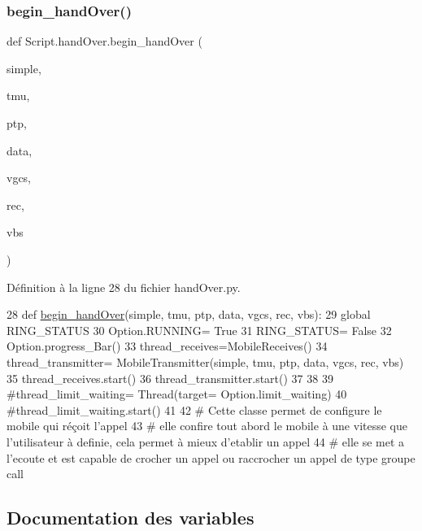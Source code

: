 \subsubsection{\texorpdfstring{begin\+\_\+hand\+Over()}{begin\_handOver()}}
{\footnotesize\ttfamily def Script.\+hand\+Over.\+begin\+\_\+hand\+Over (\begin{DoxyParamCaption}\item[{}]{simple,  }\item[{}]{tmu,  }\item[{}]{ptp,  }\item[{}]{data,  }\item[{}]{vgcs,  }\item[{}]{rec,  }\item[{}]{vbs }\end{DoxyParamCaption})}



Définition à la ligne 28 du fichier hand\+Over.\+py.


\begin{DoxyCode}
28 \textcolor{keyword}{def }\hyperlink{namespaceScript_1_1handOver_a4d9a0e646528d168d925b4bcd6f078a6}{begin\_handOver}(simple, tmu, ptp, data, vgcs, rec, vbs):
29     \textcolor{keyword}{global} RING\_STATUS
30     Option.RUNNING= \textcolor{keyword}{True}
31     RING\_STATUS= \textcolor{keyword}{False}
32     Option.progress\_Bar()
33     thread\_receives=MobileReceives()
34     thread\_transmitter= MobileTransmitter(simple, tmu, ptp, data, vgcs, rec, vbs)
35     thread\_receives.start()
36     thread\_transmitter.start()
37 
38 
39     \textcolor{comment}{#thread\_limit\_waiting= Thread(target= Option.limit\_waiting)
}
40     \textcolor{comment}{#thread\_limit\_waiting.start()
}
41 
42 \textcolor{comment}{# Cette classe permet de configure le mobile qui réçoit l'appel
}
43 \textcolor{comment}{# elle confire tout abord le mobile à une vitesse que l'utilisateur à definie, cela permet à mieux
       d'etablir un appel
}
44 \textcolor{comment}{# elle se met a l'ecoute et est capable de crocher un appel ou raccrocher un appel de type groupe call
}
\end{DoxyCode}


\subsection{Documentation des variables}
\mbox{\label{namespaceScript_1_1handOver_a10996755a745f6ffa98a8c5235d8d4b3}} 
